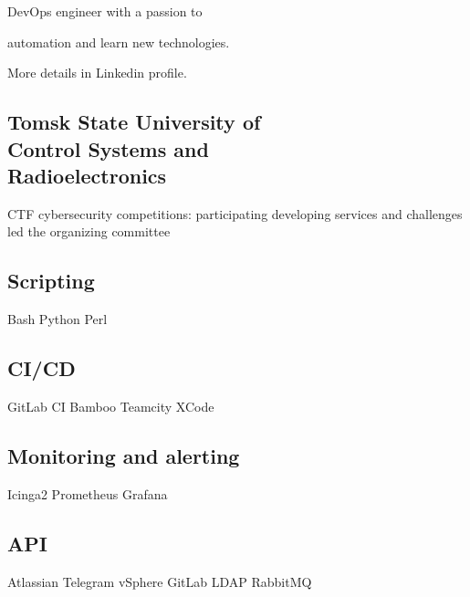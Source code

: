 \documentclass[a4paper]{MagicalCV}
\begin{document}
\lastupdated


\begin{minipage}[t]{0.33\textwidth} 


DevOps engineer with a passion to

automation and learn new technologies.

More details in Linkedin profile.
\sectionsep




\sectionsep


\subsection{Tomsk State University of \\ Control Systems and \\ Radioelectronics}
\vspace{\topsep} %
CTF cybersecurity competitions: participating \textbullet{} developing services and challenges \textbullet{} led the organizing committee
\sectionsep


\subsection{Scripting}
Bash \textbullet{} Python \textbullet{} Perl 
\subsection{CI/CD}
GitLab CI \textbullet{} Bamboo \textbullet{} Teamcity \textbullet{} XCode
\subsection{Monitoring and alerting}
Icinga2 \textbullet{} Prometheus \textbullet{} Grafana
\subsection{API}
Atlassian \textbullet{} Telegram \textbullet{} vSphere \textbullet{}
GitLab \textbullet{} LDAP \textbullet{} RabbitMQ

\end{minipage}
\end{document}
